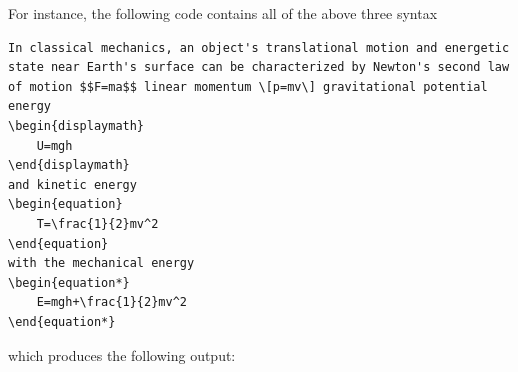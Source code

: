 		For instance, the following code contains all of the above three syntax
\begin{lstlisting}
In classical mechanics, an object's translational motion and energetic state near Earth's surface can be characterized by Newton's second law of motion $$F=ma$$ linear momentum \[p=mv\] gravitational potential energy
\begin{displaymath}
	U=mgh
\end{displaymath}
and kinetic energy
\begin{equation}
	T=\frac{1}{2}mv^2
\end{equation}
with the mechanical energy
\begin{equation*}
	E=mgh+\frac{1}{2}mv^2
\end{equation*}
\end{lstlisting}
		which produces the following output:

